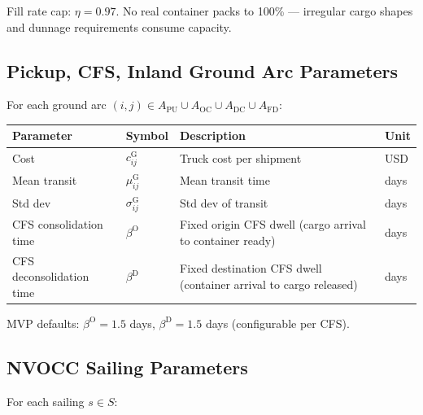 \documentclass[11pt,a4paper]{article}
\theoremstyle{definition}
\begin{document}
Fill rate cap: $\eta = 0.97$. No real container packs to 100\% — irregular cargo shapes
and dunnage requirements consume capacity.

\subsection{Pickup, CFS, Inland Ground Arc Parameters}

For each ground arc $(i,j) \in A_{\text{PU}} \cup A_{\text{OC}} \cup A_{\text{DC}} \cup A_{\text{FD}}$:

\begin{center}
\begin{tabular}{llp{6.5cm}l}
\toprule
Parameter & Symbol & Description & Unit \\
\midrule
Cost & $c_{ij}^{\text{G}}$ & Truck cost per shipment & USD \\
Mean transit & $\mu_{ij}^{\text{G}}$ & Mean transit time & days \\
Std dev & $\sigma_{ij}^{\text{G}}$ & Std dev of transit & days \\
CFS consolidation time & $\beta^{\text{O}}$ & Fixed origin CFS dwell (cargo arrival to container ready) & days \\
CFS deconsolidation time & $\beta^{\text{D}}$ & Fixed destination CFS dwell (container arrival to cargo released) & days \\
\bottomrule
\end{tabular}
\end{center}

MVP defaults: $\beta^{\text{O}} = 1.5$ days, $\beta^{\text{D}} = 1.5$ days (configurable per CFS).

\subsection{NVOCC Sailing Parameters}

For each sailing $s \in S$:
\end{document}
